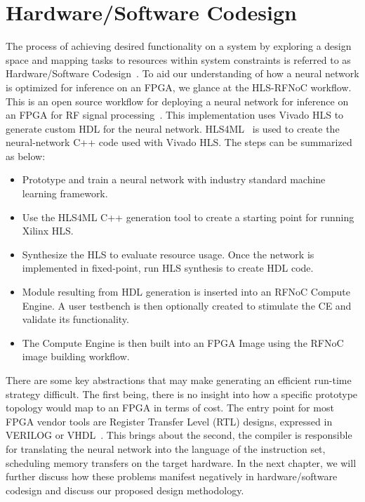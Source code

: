 \chapter[Hardware-Software Codesign]{Hardware/Software Codesign}\label{ch:fpga-codesign}
The process of achieving desired functionality on a system by exploring a design space and mapping tasks to resources within system constraints is referred to as Hardware/Software Codesign~\cite{6172642}. 
To aid our understanding of how a neural network is optimized for inference on an FPGA, we glance at the HLS-RFNoC workflow. This is an open source workflow for deploying a neural network for inference on an FPGA for RF signal processing~\cite{Charles2013}. This implementation uses Vivado HLS to generate custom HDL for the neural network. HLS4ML~\cite{nhan_tran_2019_3359214} is used to create the neural-network C++ code used with Vivado HLS. 
The steps can be summarized as below:
\begin{itemize}
    \item Prototype and train a neural network with industry standard machine learning framework.
    \item Use the HLS4ML C++ generation tool to create a starting point for running Xilinx HLS.
    \item Synthesize the HLS to evaluate resource usage. Once the network is implemented in fixed-point, run HLS synthesis to create HDL code.
    \item Module resulting from HDL generation is inserted into an RFNoC Compute Engine. A user testbench is then optionally created to stimulate the CE and validate its functionality. 
    \item The Compute Engine is then built into an FPGA Image using the RFNoC image building workflow.
\end{itemize}

There are some key abstractions that may make generating an efficient run-time strategy difficult. The first being, there is no insight into how a specific prototype topology would map to an FPGA in terms of cost. The entry point for most FPGA vendor tools are Register Transfer Level (RTL) designs, expressed in VERILOG or VHDL~\cite{umuroglu2018accelerating}. This brings about the second, the compiler is responsible for translating the neural network into the language of the instruction set, scheduling memory transfers on the target hardware. In the next chapter, we will further discuss how these problems manifest negatively in hardware/software codesign and discuss our proposed design methodology. 


